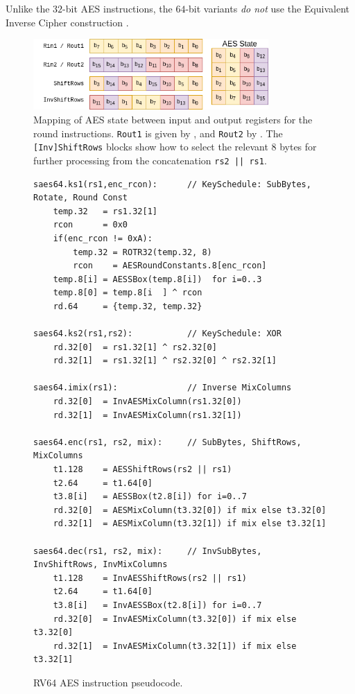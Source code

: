 Unlike the $32$-bit AES instructions, the $64$-bit variants
{\em do not} use the Equivalent Inverse Cipher
construction \cite[Section 5.3.5]{nist:fips:197}.

\begin{figure}[h]
\centering
\includegraphics[width=0.8\textwidth]{diagrams/aes-rv64-state.png}
\caption{
Mapping of AES state between input and output registers for the round
instructions.
{\tt Rout1} is given by ,
and
{\tt Rout2}          by .
The {\tt [Inv]ShiftRows} blocks show how to select the relevant $8$ bytes
for further processing from the concatenation {\tt rs2 || \tt rs1}.
}
\label{fig:aes:rv64:mapping}
\end{figure}

\begin{figure}[h!]
\begin{lstlisting}[language=pseudo]
saes64.ks1(rs1,enc_rcon):      // KeySchedule: SubBytes, Rotate, Round Const
    temp.32   = rs1.32[1]
    rcon      = 0x0
    if(enc_rcon != 0xA):
        temp.32 = ROTR32(temp.32, 8)
        rcon    = AESRoundConstants.8[enc_rcon]
    temp.8[i] = AESSBox(temp.8[i])  for i=0..3
    temp.8[0] = temp.8[i  ] ^ rcon
    rd.64     = {temp.32, temp.32}

saes64.ks2(rs1,rs2):           // KeySchedule: XOR
    rd.32[0]  = rs1.32[1] ^ rs2.32[0]
    rd.32[1]  = rs1.32[1] ^ rs2.32[0] ^ rs2.32[1]

saes64.imix(rs1):              // Inverse MixColumns
    rd.32[0]  = InvAESMixColumn(rs1.32[0])
    rd.32[1]  = InvAESMixColumn(rs1.32[1])

saes64.enc(rs1, rs2, mix):     // SubBytes, ShiftRows, MixColumns
    t1.128    = AESShiftRows(rs2 || rs1)
    t2.64     = t1.64[0]
    t3.8[i]   = AESSBox(t2.8[i]) for i=0..7
    rd.32[0]  = AESMixColumn(t3.32[0]) if mix else t3.32[0]
    rd.32[1]  = AESMixColumn(t3.32[1]) if mix else t3.32[1]

saes64.dec(rs1, rs2, mix):     // InvSubBytes, InvShiftRows, InvMixColumns
    t1.128    = InvAESShiftRows(rs2 || rs1)
    t2.64     = t1.64[0]
    t3.8[i]   = InvAESSBox(t2.8[i]) for i=0..7
    rd.32[0]  = InvAESMixColumn(t3.32[0]) if mix else t3.32[0]
    rd.32[1]  = InvAESMixColumn(t3.32[1]) if mix else t3.32[1]
\end{lstlisting}
\caption{
RV64 AES instruction pseudocode.
}
\label{fig:pesudo:aes:rv64}
\end{figure}

